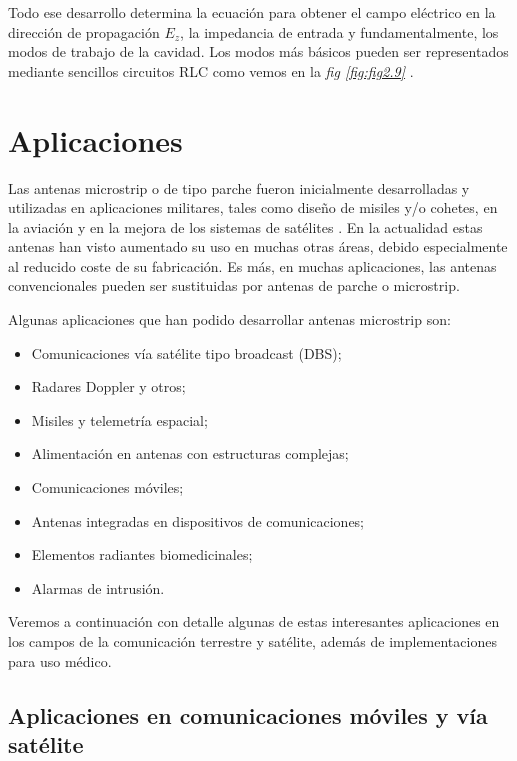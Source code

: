 Todo ese desarrollo determina la ecuación para obtener el campo eléctrico en la dirección de propagación $E_{z}$, la impedancia de entrada y fundamentalmente, los modos de trabajo de la cavidad. Los modos más básicos pueden ser representados mediante sencillos circuitos RLC como vemos en la \textit{fig \ref{fig:fig2.9}} \cite{garg4}.


\section{Aplicaciones}\label{sec:aplicaciones}

Las antenas microstrip o de tipo parche fueron inicialmente desarrolladas y utilizadas en aplicaciones militares, tales como diseño de misiles y/o cohetes, en la aviación y en la mejora de los sistemas de satélites \cite{garg1}. En la actualidad estas antenas han visto aumentado su uso en muchas otras áreas, debido especialmente al reducido coste de su fabricación. Es más, en muchas aplicaciones, las antenas convencionales pueden ser sustituidas por antenas de parche o microstrip.

\begin{flushleft}
    Algunas aplicaciones que han podido desarrollar antenas microstrip son:
\end{flushleft}

\begin{itemize}
    \item Comunicaciones vía satélite tipo broadcast (DBS);
    \item Radares Doppler y otros;
    \item Misiles y telemetría espacial;
    \item Alimentación en antenas con estructuras complejas;
    \item Comunicaciones móviles;
    \item Antenas integradas en dispositivos de comunicaciones;
    \item Elementos radiantes biomedicinales;
    \item Alarmas de intrusión.
\end{itemize}

Veremos a continuación con detalle algunas de estas interesantes aplicaciones en los campos de la comunicación terrestre y satélite, además de implementaciones para uso médico.

\subsection{Aplicaciones en comunicaciones móviles y vía satélite}\label{subsec:aplicaciones-en-comunicaciones-moviles-y-via-satelite}

